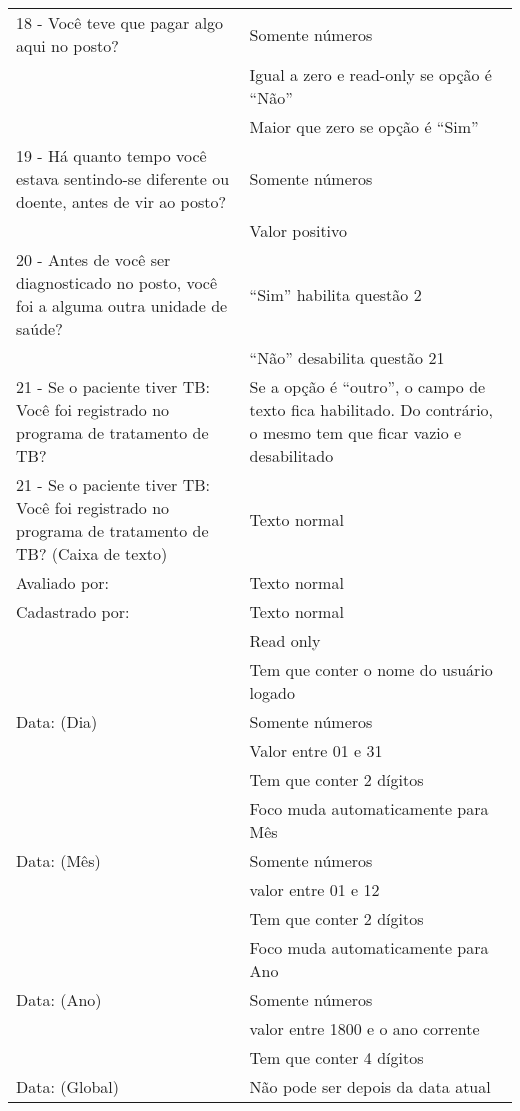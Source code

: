 \begin{longtable}{p{}|p{}}
18 - Você teve que pagar algo aqui no posto? & Somente números \\ \cline{2-2} & Igual a zero e read-only se opção é ``Não'' \\ \cline{2-2} & Maior que zero se opção é ``Sim'' \\ \hline

19 - Há quanto tempo você estava sentindo-se diferente ou doente, antes de vir ao posto? & Somente números \\ \cline{2-2} & Valor positivo \\ \hline

20 - Antes de você ser diagnosticado no posto, você foi a alguma outra unidade de saúde?  & ``Sim'' habilita questão 2 \\ \cline{2-2} & ``Não'' desabilita questão 21 \\ \hline

21 - Se o paciente tiver TB: Você foi registrado no programa de tratamento de TB? & Se a opção é ``outro'', o campo de texto fica habilitado. Do contrário, o mesmo tem que ficar vazio e desabilitado \\ \hline

21 - Se o paciente tiver TB: Você foi registrado no programa de tratamento de TB? (Caixa de texto) & Texto normal \\ \hline

Avaliado por: & Texto normal \\ \hline

Cadastrado por: & Texto normal \\ \cline{2-2} & Read only \\ \cline{2-2} & Tem que conter o nome do usuário logado \\ \hline

Data: (Dia) & Somente números \\ \cline{2-2} & Valor entre 01 e 31 \\ \cline{2-2} & Tem que conter 2 dígitos \\ \cline{2-2} & Foco muda automaticamente para Mês \\ \hline
Data: (Mês) & Somente números \\ \cline{2-2} & valor entre 01 e 12 \\ \cline{2-2} & Tem que conter 2 dígitos \\ \cline{2-2} & Foco muda automaticamente para Ano \\ \hline
Data: (Ano) & Somente números \\ \cline{2-2} & valor entre 1800 e o ano corrente \\ \cline{2-2} & Tem que conter 4 dígitos \\ \hline
Data: (Global) & Não pode ser depois da data atual \\ \hline

\end{longtable}
